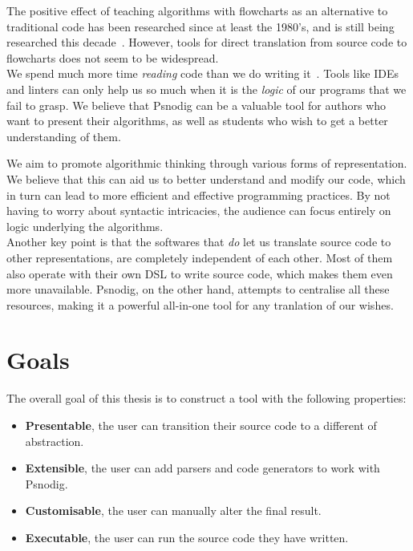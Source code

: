 The positive effect of teaching algorithms with flowcharts as an alternative to traditional code has been researched since at least the 1980's, and is still being researched this decade~\cite{flowchartsAreGood1, flowchartsAreGood2, flowchartsAreGood3}. However, tools for direct translation from source code to flowcharts does not seem to be widespread. \\

We spend much more time \textit{reading} code than we do writing it~\cite[14]{weReadMoreThanWeCode}. Tools like IDEs and linters can only help us so much when it is the \textit{logic} of our programs that we fail to grasp. We believe that Psnodig can be a valuable tool for authors who want to present their algorithms, as well as students who wish to get a better understanding of them. \\


We aim to promote algorithmic thinking through various forms of representation. We believe that this can aid us to better understand and modify our code, which in turn can lead to more efficient and effective programming practices. By not having to worry about syntactic intricacies, the audience can focus entirely on logic underlying the algorithms. \\

Another key point is that the softwares that \textit{do} let us translate source code to other representations, are completely independent of each other. Most of them also operate with their own DSL to write source code, which makes them even more unavailable. Psnodig, on the other hand, attempts to centralise all these resources, making it a powerful all-in-one tool for any tranlation of our wishes. \\



\section{Goals}

The overall goal of this thesis is to construct a tool with the following properties:

\begin{itemize}
    \item \textbf{Presentable}, the user can transition their source code to a different of abstraction.
    \item \textbf{Extensible}, the user can add parsers and code generators to work with Psnodig.
    \item \textbf{Customisable}, the user can manually alter the final result.
    \item \textbf{Executable}, the user can run the source code they have written.
\end{itemize}

